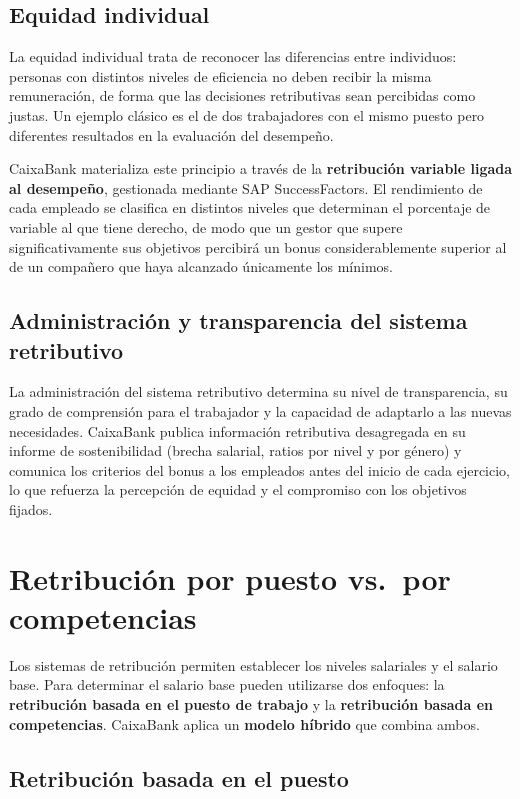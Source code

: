 \subsection{Equidad individual}

La equidad individual trata de reconocer las diferencias entre individuos: personas con distintos niveles de eficiencia no deben recibir la misma remuneración, de forma que las decisiones retributivas sean percibidas como justas. Un ejemplo clásico es el de dos trabajadores con el mismo puesto pero diferentes resultados en la evaluación del desempeño.

CaixaBank materializa este principio a través de la \textbf{retribución variable ligada al desempeño}, gestionada mediante SAP SuccessFactors. El rendimiento de cada empleado se clasifica en distintos niveles que determinan el porcentaje de variable al que tiene derecho, de modo que un gestor que supere significativamente sus objetivos percibirá un bonus considerablemente superior al de un compañero que haya alcanzado únicamente los mínimos.

\subsection{Administración y transparencia del sistema retributivo}

La administración del sistema retributivo determina su nivel de transparencia, su grado de comprensión para el trabajador y la capacidad de adaptarlo a las nuevas necesidades. CaixaBank publica información retributiva desagregada en su informe de sostenibilidad (brecha salarial, ratios por nivel y por género) y comunica los criterios del bonus a los empleados antes del inicio de cada ejercicio, lo que refuerza la percepción de equidad y el compromiso con los objetivos fijados.

\section{Retribución por puesto vs.\ por competencias}

Los sistemas de retribución permiten establecer los niveles salariales y el salario base. Para determinar el salario base pueden utilizarse dos enfoques: la \textbf{retribución basada en el puesto de trabajo} y la \textbf{retribución basada en competencias}. CaixaBank aplica un \textbf{modelo híbrido} que combina ambos.

\subsection{Retribución basada en el puesto}

